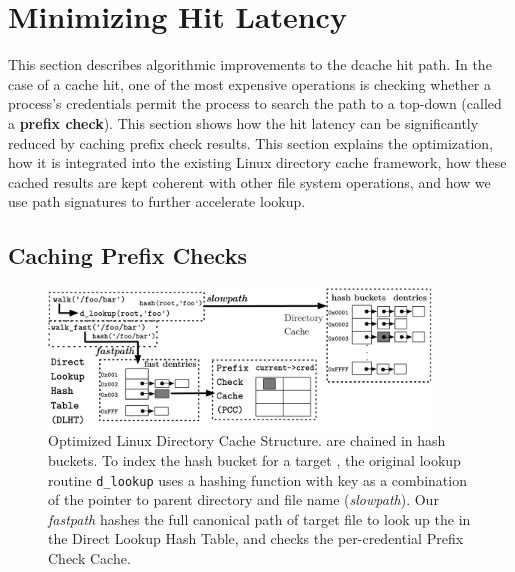 \section{Minimizing Hit Latency}
\label{sec:dcache}

This section describes
algorithmic improvements to the dcache hit path.  
In the case of a cache hit, one of the most expensive operations
is checking whether 
a process's credentials permit the process to search
the path to a \dentry{} top-down (called a {\bf prefix check}).
This section shows how the hit latency can be significantly reduced
by caching prefix check results.
This section explains the optimization, how it is integrated into the existing Linux directory cache 
framework, how these cached results are kept coherent with other file system operations,
and how we use path signatures to further accelerate lookup.



\subsection{Caching Prefix Checks}
\label{sec:dcache:prefixcheck}

\begin{figure}[t!]
\centering
\includegraphics[width=4in]{dcache/figures/dcache-structure.pdf}
\footnotesize
\caption[Optimized Linux Directory Cache Structure.]
{Optimized Linux Directory Cache Structure. \dentries{} are chained in hash buckets. To index the hash bucket for a target \dentry{}, the original lookup routine {\tt d\_lookup} uses a hashing function with key as a combination of the pointer to parent directory and file name ({\em slowpath}).
Our {\em fastpath} hashes the full canonical path of target file to look up the \dentry{}
in the Direct Lookup Hash Table,
and checks the per-credential Prefix Check Cache.}
\label{fig:dcache}
\end{figure}

